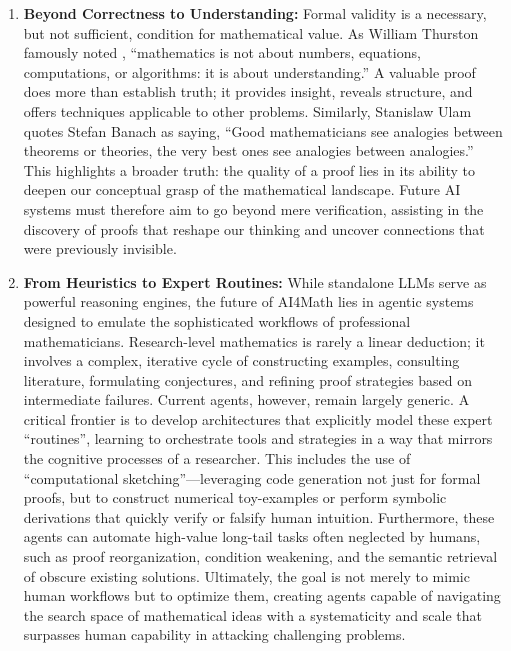 \documentclass[11pt]{article}
\numberwithin{equation}{section}
\begin{document}
\begin{enumerate}
    \item \textbf{Beyond Correctness to Understanding:} Formal validity is a necessary, but not sufficient, condition for mathematical value. As William Thurston famously noted \cite{c7da7d34-de5b-3a8d-8096-59d6b94e9a82}, ``mathematics is not about numbers, equations, computations, or algorithms: it is about understanding.'' A valuable proof does more than establish truth; it provides insight, reveals structure, and offers techniques applicable to other problems. Similarly, Stanislaw Ulam \cite{ulam1976adventures} quotes Stefan Banach as saying, ``Good mathematicians see analogies between theorems or theories, the very best ones see analogies between analogies.'' This highlights a broader truth: the quality of a proof lies in its ability to deepen our conceptual grasp of the mathematical landscape. Future AI systems must therefore aim to go beyond mere verification, assisting in the discovery of proofs that reshape our thinking and uncover connections that were previously invisible. 

    \item \textbf{From Heuristics to Expert Routines:} While standalone LLMs serve as powerful reasoning engines, the future of AI4Math lies in agentic systems designed to emulate the sophisticated workflows of professional mathematicians. Research-level mathematics is rarely a linear deduction; it involves a complex, iterative cycle of constructing examples, consulting literature, formulating conjectures, and refining proof strategies based on intermediate failures. Current agents, however, remain largely generic. A critical frontier is to develop architectures that explicitly model these expert ``routines'', learning to orchestrate tools and strategies in a way that mirrors the cognitive processes of a researcher. This includes the use of ``computational sketching''—leveraging code generation not just for formal proofs, but to construct numerical toy-examples or perform symbolic derivations that quickly verify or falsify human intuition. Furthermore, these agents can automate high-value long-tail tasks often neglected by humans, such as proof reorganization, condition weakening, and the semantic retrieval of obscure existing solutions. Ultimately, the goal is not merely to mimic human workflows but to optimize them, creating agents capable of navigating the search space of mathematical ideas with a systematicity and scale that surpasses human capability in attacking challenging problems.


\end{enumerate}
\end{document}

